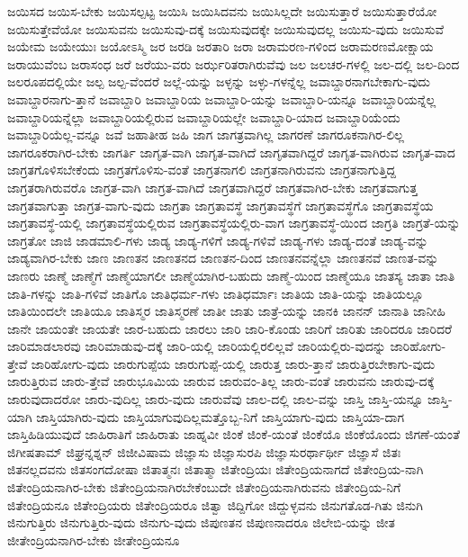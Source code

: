{ಜಯಿಸದ
ಜಯಿಸ-ಬೇಕು
ಜಯಿಸಲ್ಪಟ್ಟ
ಜಯಿಸಿ
ಜಯಿಸಿದವನು
ಜಯಿಸಿಲ್ಲದೇ
ಜಯಿಸುತ್ತಾರೆ
ಜಯಿಸುತ್ತಾರೆಯೋ
ಜಯಿಸುತ್ತೇವೆಯೋ
ಜಯಿಸುವನು
ಜಯಿಸುವು-ದಕ್ಕೆ
ಜಯಿಸುವುದಕ್ಕೇ
ಜಯಿಸುವುದಲ್ಲ
ಜಯಿಸು-ವುದು
ಜಯಿಸುವೆ
ಜಯೇಮ
ಜಯೇಯುಃ
ಜಯೋಽಸ್ಮಿ
ಜರ
ಜರಡಿ
ಜರತಾರಿ
ಜರಾ
ಜರಾಮರಣ-ಗಳಿಂದ
ಜರಾಮರಣಮೋಕ್ಷಾಯ
ಜರಾಯುವೆಂಬ
ಜರಾಸಂಧ
ಜರೆ
ಜರೆಯು-ವರು
ಜರ್ಝರಿತರಾಗಿರುವೆವು
ಜಲ
ಜಲಚರ-ಗಳಲ್ಲಿ
ಜಲ-ದಲ್ಲಿ
ಜಲ-ದಿಂದ
ಜಲರೂಪದಲ್ಲಿಯೇ
ಜಲ್ಪ
ಜಲ್ಪ-ವೆಂದರೆ
ಜಲ್ಲೆ-ಯನ್ನು
ಜಳ್ಳನ್ನು
ಜಳ್ಳು-ಗಳನ್ನೆಲ್ಲ
ಜವಾಬ್ದಾರನಾಗಬೇಕಾಗು-ವುದು
ಜವಾಬ್ದಾರನಾಗು-ತ್ತಾನೆ
ಜವಾಬ್ದಾರಿ
ಜವಾಬ್ದಾರಿಯ
ಜವಾಬ್ದಾರಿ-ಯನ್ನು
ಜವಾಬ್ದಾರಿ-ಯನ್ನೂ
ಜವಾಬ್ದಾರಿಯನ್ನೆಲ್ಲ
ಜವಾಬ್ದಾರಿಯನ್ನೆಲ್ಲಾ
ಜವಾಬ್ದಾರಿಯಲ್ಲಿರುವ
ಜವಾಬ್ದಾರಿಯಲ್ಲೇ
ಜವಾಬ್ದಾರಿ-ಯಾದ
ಜವಾಬ್ದಾರಿಯೆಂದು
ಜವಾಬ್ದಾರಿಯೆಲ್ಲ-ವನ್ನೂ
ಜವೆ
ಜಹಾತೀಹ
ಜಹಿ
ಜಾಗ
ಜಾಗತ್ರವಾಗಿಲ್ಲ
ಜಾಗರಣೆ
ಜಾಗರೂಕನಾಗಿರ-ಲಿಲ್ಲ
ಜಾಗರೂಕರಾಗಿರ-ಬೇಕು
ಜಾಗರ್ತಿ
ಜಾಗೃತ-ವಾಗಿ
ಜಾಗೃತ-ವಾಗಿದೆ
ಜಾಗೃತವಾಗಿದ್ದರೆ
ಜಾಗೃತ-ವಾಗಿರುವ
ಜಾಗೃತ-ವಾದ
ಜಾಗ್ರತಗೊಳಿಸಬೇಕೆಂದು
ಜಾಗ್ರತಗೊಳಿಸು-ವಂತೆ
ಜಾಗ್ರತನಾಗಲಿ
ಜಾಗ್ರತನಾಗಿರುವನು
ಜಾಗ್ರತನಾಗುತ್ತಿದ್ದ
ಜಾಗ್ರತರಾಗಿರುವರೊ
ಜಾಗ್ರತ-ವಾಗಿ
ಜಾಗ್ರತ-ವಾಗಿದೆ
ಜಾಗ್ರತವಾಗಿದ್ದರೆ
ಜಾಗ್ರತವಾಗಿರ-ಬೇಕು
ಜಾಗ್ರತವಾಗುತ್ತ
ಜಾಗ್ರತವಾಗುತ್ತಾ
ಜಾಗ್ರತ-ವಾಗು-ವುದು
ಜಾಗ್ರತಾ
ಜಾಗ್ರತಾವಸ್ಥೆ
ಜಾಗ್ರತಾವಸ್ಥೆಗೆ
ಜಾಗ್ರತಾವಸ್ಥೆಗೊ
ಜಾಗ್ರತಾವಸ್ಥೆಯ
ಜಾಗ್ರತಾವಸ್ಥೆ-ಯಲ್ಲಿ
ಜಾಗ್ರತಾವಸ್ಥೆಯಲ್ಲಿರುವ
ಜಾಗ್ರತಾವಸ್ಥೆಯಲ್ಲಿರು-ವಾಗ
ಜಾಗ್ರತಾವಸ್ಥೆ-ಯಿಂದ
ಜಾಗ್ರತಿ
ಜಾಗ್ರತೆ-ಯನ್ನು
ಜಾಗ್ರತೋ
ಜಾಜಿ
ಜಾಡಮಾಲಿ-ಗಳು
ಜಾಡ್ಯ
ಜಾಡ್ಯ-ಗಳಿಗೆ
ಜಾಡ್ಯ-ಗಳಿವೆ
ಜಾಡ್ಯ-ಗಳು
ಜಾಡ್ಯ-ದಂತೆ
ಜಾಡ್ಯ-ವನ್ನು
ಜಾಡ್ಯವಾಗಿರ-ಬೇಕು
ಜಾಣ
ಜಾಣತನ
ಜಾಣತನದ
ಜಾಣತನ-ದಿಂದ
ಜಾಣತನವನ್ನೆಲ್ಲಾ
ಜಾಣತನವೆ
ಜಾಣತ-ವನ್ನು
ಜಾಣರು
ಜಾಣ್ಮೆ
ಜಾಣ್ಮೆಗೆ
ಜಾಣ್ಮೆಯಾಗಲೀ
ಜಾಣ್ಮೆಯಾಗಿರ-ಬಹುದು
ಜಾಣ್ಮೆ-ಯಿಂದ
ಜಾಣ್ಮೆಯೂ
ಜಾತಸ್ಯ
ಜಾತಾ
ಜಾತಿ
ಜಾತಿ-ಗಳನ್ನು
ಜಾತಿ-ಗಳಿವೆ
ಜಾತಿಗೊ
ಜಾತಿಧರ್ಮ-ಗಳು
ಜಾತಿಧರ್ಮಾಃ
ಜಾತಿಯ
ಜಾತಿ-ಯನ್ನು
ಜಾತಿಯಲ್ಲೂ
ಜಾತಿಯಿಂದಲೇ
ಜಾತಿಯೂ
ಜಾತಿಸ್ಮರ
ಜಾತಿಸ್ಮರಣೆ
ಜಾತೀ
ಜಾತು
ಜಾತ್ರೆ-ಯನ್ನು
ಜಾನಕಿ
ಜಾನನ್
ಜಾನಾತಿ
ಜಾನೀಹಿ
ಜಾನೇ
ಜಾಯಂತೇ
ಜಾಯತೇ
ಜಾರ-ಬಹುದು
ಜಾರಲು
ಜಾರಿ
ಜಾರಿ-ಕೊಂಡು
ಜಾರಿಗೆ
ಜಾರಿತು
ಜಾರಿದರೂ
ಜಾರಿದರೆ
ಜಾರಿಮಾಡಲಾರವು
ಜಾರಿಮಾಡುವು-ದಕ್ಕೆ
ಜಾರಿ-ಯಲ್ಲಿ
ಜಾರಿಯಲ್ಲಿರಲಿಲ್ಲವೆ
ಜಾರಿಯಲ್ಲಿರು-ವುದನ್ನು
ಜಾರಿಹೋಗು-ತ್ತೇವೆ
ಜಾರಿಹೋಗು-ವುದು
ಜಾರುಗುಪ್ಪೆಯ
ಜಾರುಗುಪ್ಪೆ-ಯಲ್ಲಿ
ಜಾರುತ್ತ
ಜಾರು-ತ್ತಾನೆ
ಜಾರುತ್ತಿರಬೇಕಾಗು-ವುದು
ಜಾರುತ್ತಿರುವ
ಜಾರು-ತ್ತೇವೆ
ಜಾರುಭೂಮಿಯ
ಜಾರುವ
ಜಾರುವಂ-ತಿಲ್ಲ
ಜಾರು-ವಂತೆ
ಜಾರುವನು
ಜಾರುವು-ದಕ್ಕೆ
ಜಾರುವುದಾದರೋ
ಜಾರು-ವುದಿಲ್ಲ
ಜಾರು-ವುದು
ಜಾರುವೆವು
ಜಾಲ-ದಲ್ಲಿ
ಜಾಲ-ವನ್ನು
ಜಾಸ್ತಿ
ಜಾಸ್ತಿ-ಯನ್ನೂ
ಜಾಸ್ತಿ-ಯಾಗಿ
ಜಾಸ್ತಿಯಾಗಿರು-ವುದು
ಜಾಸ್ತಿಯಾಗುವುದಿಲ್ಲಮತ್ತೊಬ್ಬ-ನಿಗೆ
ಜಾಸ್ತಿಯಾಗು-ವುದು
ಜಾಸ್ತಿಯಾ-ದಾಗ
ಜಾಸ್ತಿಹಿಡಿಯುವುದೆ
ಜಾಹಿರಾತಿಗೆ
ಜಾಹಿರಾತು
ಜಾಹ್ನವೀ
ಜಿಂಕೆ
ಜಿಂಕೆ-ಯಂತೆ
ಜಿಂಕೆಯೊ
ಜಿಂಕೆಯೊಂದು
ಜಿಗಣೆ-ಯಂತೆ
ಜಿಗೀಷತಾಮ್
ಜಿಘ್ರನ್ನಶ್ನನ್
ಜಿಜೀವಿಷಾಮ
ಜಿಜ್ಞಾಸು
ಜಿಜ್ಞಾಸುರಪಿ
ಜಿಜ್ಞಾಸುರರ್ಥಾರ್ಥೀ
ಜಿಜ್ಞಾಸೆ
ಜಿತಃ
ಜಿತನಲ್ಲದವನು
ಜಿತಸಂಗದೋಷಾ
ಜಿತಾತ್ಮನಃ
ಜಿತಾತ್ಮಾ
ಜಿತೇಂದ್ರಿಯಃ
ಜಿತೇಂದ್ರಿಯನಾಗದೆ
ಜಿತೇಂದ್ರಿಯ-ನಾಗಿ
ಜಿತೇಂದ್ರಿಯನಾಗಿರ-ಬೇಕು
ಜಿತೇಂದ್ರಿಯನಾಗಿರಬೇಕೆಂಬುದೇ
ಜಿತೇಂದ್ರಿಯನಾಗಿರುವನು
ಜಿತೇಂದ್ರಿಯ-ನಿಗೆ
ಜಿತೇಂದ್ರಿಯನೂ
ಜಿತೇಂದ್ರಿಯರು
ಜಿತೇಂದ್ರಿಯರೂ
ಜಿತ್ವಾ
ಜಿದ್ದಿಗೋ
ಜಿದ್ದುಳ್ಳವನು
ಜಿನುಗತೊಡ-ಗಿತು
ಜಿನುಗಿ
ಜಿನುಗುತ್ತಿರು
ಜಿನುಗುತ್ತಿರು-ವುದು
ಜಿನುಗು-ವುದು
ಜಿಪುಣತನ
ಜಿಪುಣನಾದರೂ
ಜಿಲೇಬಿ-ಯನ್ನು
ಜೀತ
ಜೀತೇಂದ್ರಿಯನಾಗಿರ-ಬೇಕು
ಜೀತೇಂದ್ರಿಯನೂ
}
